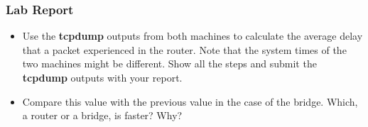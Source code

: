 \documentclass[10pt,a4paper]{article}
\numberwithin{equation}{section}
\numberwithin{figure}{section}
\numberwithin{table}{section}
\begin{document}
    \subsubsection*{ Lab Report}
    \begin{itemize}
        \setlength{\itemindent}{0pt}
        \item Use the \textbf{tcpdump} outputs from both machines to calculate the average delay that a packet experienced in the router. Note that the system times of the two machines might be different. Show all the steps and submit the \textbf{tcpdump} outputs with your report.
        \item Compare this value with the previous value in the case of the bridge. Which, a router or a bridge, is faster? Why?
    \end{itemize}
\end{document}
